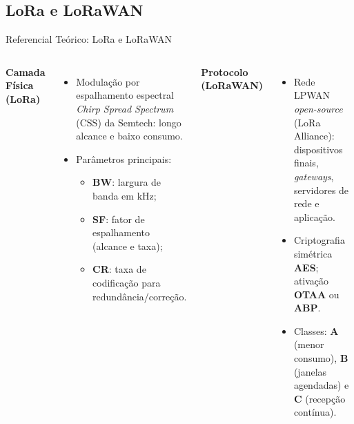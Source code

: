 \documentclass[
    aspectratio=169,
    11pt,
    brazil
]{beamer}
\begin{document}
\subsection{LoRa e LoRaWAN}
\begin{frame}{Referencial Teórico: LoRa e LoRaWAN}
  \begin{columns}[t]
    {\footnotesize\bfseries\color{senacblue}Camada Física (LoRa)}
    \begin{itemize}\scriptsize
      \setlength{\itemsep}{3pt}
      \item Modulação por espalhamento espectral \textit{Chirp Spread Spectrum} (CSS) da Semtech: longo alcance e baixo consumo.
      \item Parâmetros principais:
        \begin{itemize}\tiny
          \item \textbf{BW}: largura de banda em kHz;
          \item \textbf{SF}: fator de espalhamento (alcance e taxa);
          \item \textbf{CR}: taxa de codificação para redundância/correção.
        \end{itemize}
    \end{itemize}
    {\footnotesize\bfseries\color{senacblue}Protocolo (LoRaWAN)}
    \begin{itemize}\scriptsize
      \setlength{\itemsep}{3pt}
      \item Rede LPWAN \textit{open-source} (LoRa Alliance): dispositivos finais, \textit{gateways}, servidores de rede e aplicação.
      \item Criptografia simétrica \textbf{AES}; ativação \textbf{OTAA} ou \textbf{ABP}.
      \item Classes: \textbf{A} (menor consumo), \textbf{B} (janelas agendadas) e \textbf{C} (recepção contínua).
    \end{itemize}
  \end{columns}
\end{frame}
\end{document}
